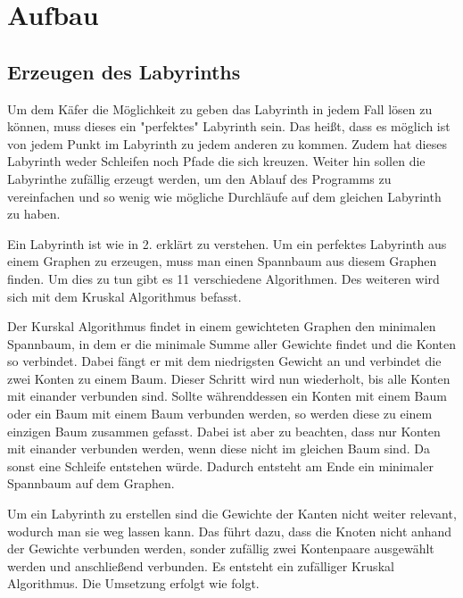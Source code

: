 \documentclass[12pt, a4paper, titlepage]{article}
\begin{document}
\newpage

\section{Aufbau}

\subsection{Erzeugen des Labyrinths}

Um dem Käfer die Möglichkeit zu geben das Labyrinth in jedem Fall lösen zu können, muss dieses ein "perfektes" Labyrinth sein.
Das heißt, dass es möglich ist von jedem Punkt im Labyrinth zu jedem anderen zu kommen.
Zudem hat dieses Labyrinth weder Schleifen noch Pfade die sich kreuzen.
Weiter hin sollen die Labyrinthe zufällig erzeugt werden, um den Ablauf des Programms zu vereinfachen und so wenig wie mögliche Durchläufe auf dem gleichen Labyrinth zu haben.

\bigskip

Ein Labyrinth ist wie in 2.
erklärt zu verstehen.
Um ein perfektes Labyrinth aus einem Graphen zu erzeugen, muss man einen Spannbaum aus diesem Graphen finden.
Um dies zu tun gibt es 11 verschiedene Algorithmen.
Des weiteren wird sich mit dem Kruskal Algorithmus befasst.


\bigskip

Der Kurskal Algorithmus findet in einem gewichteten Graphen den minimalen Spannbaum, in dem er die minimale Summe aller Gewichte findet und die Konten so verbindet.
Dabei fängt er mit dem niedrigsten Gewicht an und verbindet die zwei Konten zu einem Baum.
Dieser Schritt wird nun wiederholt, bis alle Konten mit einander verbunden sind.
Sollte währenddessen ein Konten mit einem Baum oder ein Baum mit einem Baum verbunden werden, so werden diese zu einem einzigen Baum zusammen gefasst.
Dabei ist aber zu beachten, dass nur Konten mit einander verbunden werden, wenn diese nicht im gleichen Baum sind.
Da sonst eine Schleife entstehen würde.
Dadurch entsteht am Ende ein minimaler Spannbaum auf dem Graphen.
 

\bigskip

Um ein Labyrinth zu erstellen sind die Gewichte der Kanten nicht weiter relevant, wodurch man sie weg lassen kann.
Das führt dazu, dass die Knoten nicht anhand der Gewichte verbunden werden, sonder zufällig zwei Kontenpaare ausgewählt werden und anschließend verbunden.
Es entsteht ein zufälliger Kruskal Algorithmus.
Die Umsetzung erfolgt wie folgt.
\end{document}
